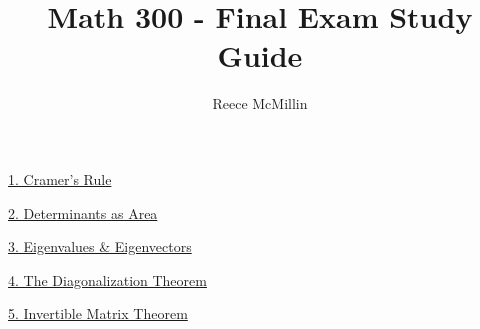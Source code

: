 
\usepackage{systeme}
\usepackage{color, colortbl}
\usepackage{graphicx}
\usepackage{hyperref}
\hypersetup{
    colorlinks,
    citecolor=black,
    filecolor=black,
    linkcolor=black,
    urlcolor=black
}
\graphicspath{ {/} }
\title{Math 300 - Final Exam Study Guide}
\author{Reece McMillin}

\maketitle
\tableofcontents
\large
\hyperlink{cramer}{1. Cramer's Rule}

\hyperlink{detarea}{2. Determinants as Area}

\hyperlink{eigen}{3. Eigenvalues \& Eigenvectors}

\hyperlink{diag}{4. The Diagonalization Theorem}

\hyperlink{imt}{5. Invertible Matrix Theorem}

